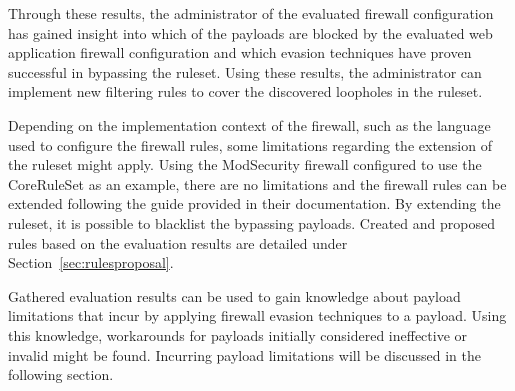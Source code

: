 Through these results, the administrator of the evaluated firewall configuration has gained insight into which of the payloads are blocked by the evaluated web application firewall configuration and which evasion techniques have proven successful in bypassing the ruleset. Using these results, the administrator can implement new filtering rules to cover the discovered loopholes in the ruleset.

Depending on the implementation context of the firewall, such as the language used to configure the firewall rules, some limitations regarding the extension of the ruleset might apply. Using the ModSecurity firewall configured to use the CoreRuleSet as an example, there are no limitations and the firewall rules can be extended following the guide provided in their documentation. By extending the ruleset, it is possible to blacklist the bypassing payloads. Created and proposed rules based on the evaluation results are detailed under Section~\ref{sec:rulesproposal}.

Gathered evaluation results can be used to gain knowledge about payload limitations that incur by applying firewall evasion techniques to a payload. Using this knowledge, workarounds for payloads initially considered ineffective or invalid might be found. Incurring payload limitations will be discussed in the following section.

